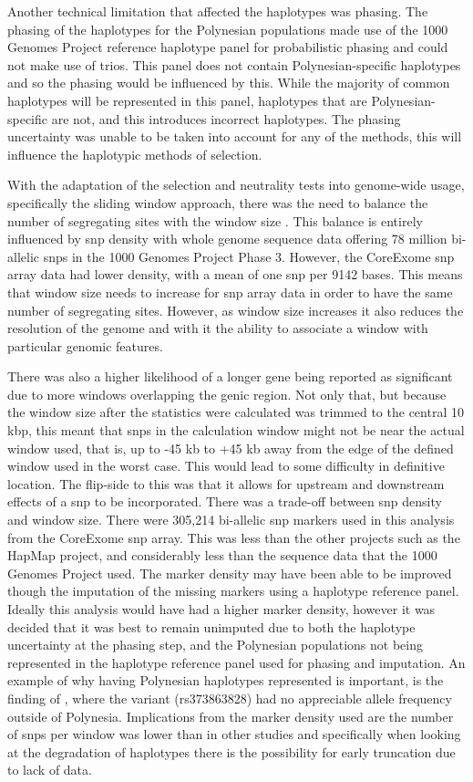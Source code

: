 \documentclass[]{report}
\begin{document}
Another technical limitation that affected the haplotypes was phasing.
The phasing of the haplotypes for the Polynesian populations made use of
the 1000 Genomes Project reference haplotype panel for probabilistic
phasing and could not make use of trios. This panel does not contain
Polynesian-specific haplotypes and so the phasing would be influenced by
this. While the majority of common haplotypes will be represented in
this panel, haplotypes that are Polynesian-specific are not, and this
introduces incorrect haplotypes. The phasing uncertainty was unable to
be taken into account for any of the methods, this will influence the
haplotypic methods of selection.

With the adaptation of the selection and neutrality tests into
genome-wide usage, specifically the sliding window approach, there was
the need to balance the number of segregating sites with the window size
\citep{Pybus2014}. This balance is entirely influenced by \gls{snp}
density with whole genome sequence data offering 78 million bi-allelic
\glspl{snp} in the 1000 Genomes Project Phase 3. However, the CoreExome
\gls{snp} array data had lower density, with a mean of one \gls{snp} per
9142 bases. This means that window size needs to increase for \gls{snp}
array data in order to have the same number of segregating sites.
However, as window size increases it also reduces the resolution of the
genome and with it the ability to associate a window with particular
genomic features.

There was also a higher likelihood of a longer gene being reported as
significant due to more windows overlapping the genic region. Not only
that, but because the window size after the statistics were calculated
was trimmed to the central 10 kbp, this meant that \glspl{snp} in the
calculation window might not be near the actual window used, that is, up
to -45 kb to +45 kb away from the edge of the defined window used in the
worst case. This would lead to some difficulty in definitive location.
The flip-side to this was that it allows for upstream and downstream
effects of a \gls{snp} to be incorporated. There was a trade-off between
\gls{snp} density and window size. There were 305,214 bi-allelic
\gls{snp} markers used in this analysis from the CoreExome \gls{snp}
array. This was less than the other projects such as the HapMap project,
and considerably less than the sequence data that the 1000 Genomes
Project used. The marker density may have been able to be improved
though the imputation of the missing markers using a haplotype reference
panel. Ideally this analysis would have had a higher marker density,
however it was decided that it was best to remain unimputed due to both
the haplotype uncertainty at the phasing step, and the Polynesian
populations not being represented in the haplotype reference panel used
for phasing and imputation. An example of why having Polynesian
haplotypes represented is important, is the finding of
\citet{Minster2016}, where the variant (rs373863828) had no appreciable
allele frequency outside of Polynesia. Implications from the marker
density used are the number of \glspl{snp} per window was lower than in
other studies and specifically when looking at the degradation of
haplotypes there is the possibility for early truncation due to lack of
data.
\end{document}
